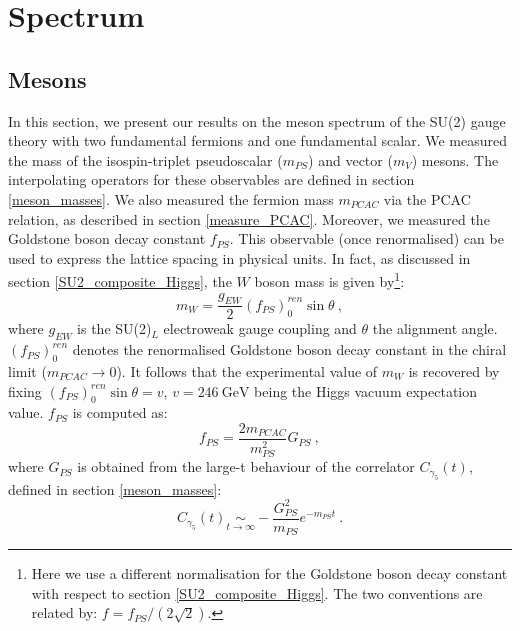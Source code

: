 

\section{Spectrum}


\subsection{Mesons}
\label{meson_spectrum}

In this section, we present our results on the meson spectrum of the SU(2) gauge theory with two fundamental fermions and one fundamental scalar. We measured the mass of the isospin-triplet pseudoscalar ($m_{PS}$) and vector ($m_V$) mesons. The interpolating operators for these observables are defined in section \ref{meson_masses}. We also measured the fermion mass $m_{PCAC}$ via the PCAC relation, as described in section \ref{measure_PCAC}. Moreover, we measured the Goldstone boson decay constant $f_{PS}$. This observable (once renormalised) can be used to express the lattice spacing in physical units. In fact, as discussed in section \ref{SU2_composite_Higgs}, the $W$ boson mass is given by\footnote{Here we use a different normalisation for the Goldstone boson decay constant with respect to section \ref{SU2_composite_Higgs}. The two conventions are related by: $f = f_{PS}/(2 \sqrt 2)$.}:
\begin{equation}
m_W = \frac{g_{EW}}{2} (f_{PS})^{ren}_0 \sin \theta \: ,
\end{equation}
%
where $g_{EW}$ is the SU(2)$_L$ electroweak gauge coupling and $\theta$ the alignment angle. $(f_{PS})^{ren}_0$ denotes the renormalised Goldstone boson decay constant in the chiral limit ($m_{PCAC} \to 0$). It follows that the experimental value of $m_W$ is recovered by fixing $(f_{PS})^{ren}_0 \sin \theta = v$, $v = 246 \: \mathrm{GeV}$ being the Higgs vacuum expectation value. $f_{PS}$ is computed as:
\begin{equation}
f_{PS} = \frac{2 m_{PCAC}}{m_{PS}^2} G_{PS} \: ,
\end{equation}
%
where $G_{PS}$ is obtained from the large-t behaviour of the correlator $C_{\gamma_5}(t)$, defined in section \ref{meson_masses}:
\begin{equation}
C_{\gamma_5}(t) \underset{t \to \infty}{\sim} -\frac{G^2_{PS}}{m_{PS}} e^{-m_{PS} t} \: .
\end{equation}

